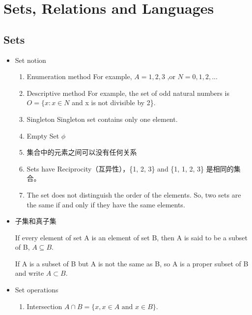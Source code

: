 \documentclass[UTF8]{ctexart}
\begin{document}
\section{Sets, Relations and Languages}

\subsection{Sets}
\begin{itemize}
    \item Set notion
    \begin{enumerate}
        \item Enumeration method
            For example, \(A={1,2,3}\) ,or \(N={0,1,2, ...}\)
        \item Descriptive method
            For example, the set of odd natural numbers is \(O=\{x: x \in N\) and x is not divisible by 2\}.
        \item Singleton
            Singleton set contains only one element.
        \item Empty Set
            $\phi$ 
        \item 集合中的元素之间可以没有任何关系
        \item Sets have Reciprocity（互异性），\{1, 2, 3\} and \{1, 1, 2, 3\} 是相同的集合。
        \item The set does not distinguish the order of the elements. So, two sets are the same if and only if they have the same elements.
    \end{enumerate}
    \item 子集和真子集
    
        If every element of set A is an element of set B, then A is said to be a subset of B, $A \subseteq B$.

        If A is a subset of B but A is not the same as B, so A is a proper subset of B and write $ A \subset B$.  
    
    \item Set operations
    \begin{enumerate}
        \item Intersection $A \cap B = \{x, x\in A \text{ and } x \in B\}$. 
        

\end{enumerate}
\end{itemize}
\end{document}
